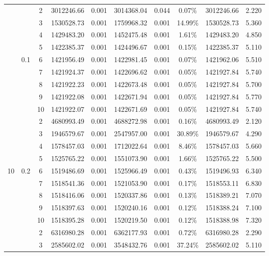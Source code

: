 {\begin{longtable}{cccrcrrcrr}
			&       & 2     & 3012246.66 & 0.001 & 3014368.04 & 0.044 & 0.07\% & 3012246.66 & 2.220 \\
			&       & 3     & 1530528.73 & 0.001 & 1759968.32 & 0.001 & 14.99\% & 1530528.73 & 5.360 \\
			&       & 4     & 1429483.20 & 0.001 & 1452475.48 & 0.001 & 1.61\% & 1429483.20 & 4.850 \\
			&       & 5     & 1422385.37 & 0.001 & 1424496.67 & 0.001 & 0.15\% & 1422385.37 & 5.110 \\
			& 0.1   & 6     & 1421956.49 & 0.001 & 1422981.45 & 0.001 & 0.07\% & 1421962.06 & 5.510 \\
			&       & 7     & 1421924.37 & 0.001 & 1422696.62 & 0.001 & 0.05\% & 1421927.84 & 5.740 \\
			&       & 8     & 1421922.23 & 0.001 & 1422673.48 & 0.001 & 0.05\% & 1421927.84 & 5.700 \\
			&       & 9     & 1421922.08 & 0.001 & 1422671.94 & 0.001 & 0.05\% & 1421927.84 & 5.770 \\
			&       & 10    & 1421922.07 & 0.001 & 1422671.69 & 0.001 & 0.05\% & 1421927.84 & 5.740 \\
			&       & 2     & 4680993.49 & 0.001 & 4688272.98 & 0.001 & 0.16\% & 4680993.49 & 2.120 \\
			&       & 3     & 1946579.67 & 0.001 & 2547957.00 & 0.001 & 30.89\% & 1946579.67 & 4.290 \\
			&       & 4     & 1578457.03 & 0.001 & 1712022.64 & 0.001 & 8.46\% & 1578457.03 & 5.660 \\
			&       & 5     & 1525765.22 & 0.001 & 1551073.90 & 0.001 & 1.66\% & 1525765.22 & 5.500 \\
	  10    & 0.2   & 6     & 1519486.69 & 0.001 & 1525966.49 & 0.001 & 0.43\% & 1519496.93 & 6.340 \\
			&       & 7     & 1518541.36 & 0.001 & 1521053.90 & 0.001 & 0.17\% & 1518553.11 & 6.830 \\
			&       & 8     & 1518416.06 & 0.001 & 1520337.86 & 0.001 & 0.13\% & 1518389.21 & 7.070 \\
			&       & 9     & 1518397.63 & 0.001 & 1520240.16 & 0.001 & 0.12\% & 1518388.24 & 7.100 \\
			&       & 10    & 1518395.28 & 0.001 & 1520219.50 & 0.001 & 0.12\% & 1518388.98 & 7.320 \\
			&       & 2     & 6316980.28 & 0.001 & 6362177.93 & 0.001 & 0.72\% & 6316980.28 & 2.290 \\
			&       & 3     & 2585602.02 & 0.001 & 3548432.76 & 0.001 & 37.24\% & 2585602.02 & 5.110 \\

\end{longtable}}
